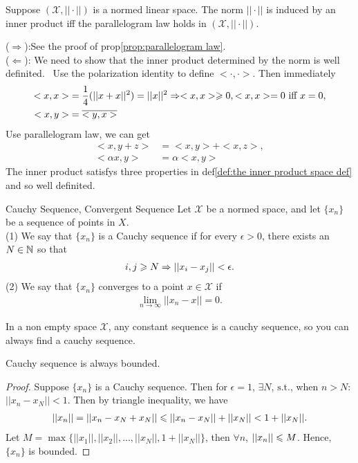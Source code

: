 \begin{theorem}{}{}
    Suppose $(\mathcal{X},||\cdot||)$ is a normed linear space. The norm $||\cdot||$ is induced by an inner product 
    iff the parallelogram law holds in $(\mathcal{X},||\cdot||)$.
\end{theorem}
\begin{proofsolution}
    ($\Rightarrow$):See the proof of prop\ref{prop:parallelogram law}.\\
    ($\Leftarrow$): We need to show that the inner product determined by the norm is well definited. \
    Use the polarization identity to define $<\cdot,\cdot>$. Then immediately 
    \begin{align*}
        <x,x> &= \frac{1}{4}(||x+x||^2)=||x||^2 \Rightarrow <x,x>\geqslant 0, <x,x>=0 \text{ iff } x=0,\\
        <x,y> &= \overline{<y,x>}
    \end{align*}
    Use parallelogram law, we can get
    \begin{align*}
        <x,y+z> &= <x,y>+<x,z>,\\
        <\alpha x,y>&=\alpha<x,y>
    \end{align*}
    The inner product satisfys three properties in def\ref{def:the inner product space def} and so well definited.
\end{proofsolution}

\begin{definition}{Cauchy Sequence, Convergent Sequence}{}
    Let $\mathcal{X}$ be a normed space, and let $\{x_n\}$ be a sequence of points in $X$. \\
    (1) We say that $\{x_n\}$ is a Cauchy sequence if for every $\epsilon>0$, there exists an $N\in \mathbb{N}$ so that
    \begin{align*}
        i,j\geqslant N\Rightarrow ||x_i-x_j||<\epsilon.
    \end{align*}
    (2) We say that $\{x_n\}$ converges to a point $x\in \mathcal{X}$ if
    \begin{align*}
        \lim_{n\rightarrow \infty} ||x_n-x||=0.
    \end{align*}
\end{definition}

\begin{remark}
    In a non empty space $\mathcal{X}$, any constant sequence is a cauchy sequence, so you can always find a cauchy sequence.
\end{remark}

\begin{proposition}{}{}
    Cauchy sequence is always bounded.
\end{proposition}
\begin{proof}
    Suppose $\{x_n\}$ is a Cauchy sequence. Then for $\epsilon=1$, $\exists N$, $\mathrm{s.t.}$, when $n>N$: $||x_n-x_N||<1$. 
    Then by  triangle inequality, we have
    \begin{align*}
        ||x_n|| = ||x_n-x_N+x_N||\leqslant ||x_n-x_N||+||x_N|| <1+||x_N||.
    \end{align*}
    Let $M=\max\{||x_1||,||x_2||,...,||x_N||,1+||x_N||\}$, then $\forall n$, $||x_n||\leqslant M$. Hence, $\{x_n\}$ is bounded.
\end{proof}

